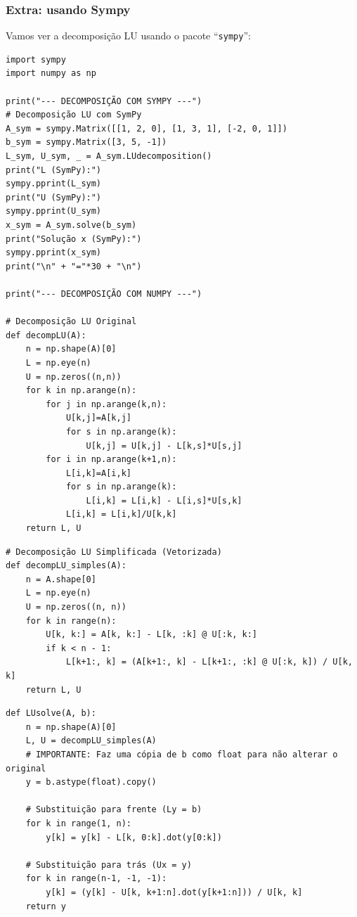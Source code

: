 \documentclass[../numerical_methods.tex]{subfiles}
\begin{document}
\subsubsection{Extra: usando Sympy}
Vamos ver a decomposição LU usando o pacote ``\texttt{sympy}'':
\begin{listing}[H]
	\begin{verbatim}
import sympy
import numpy as np

print("--- DECOMPOSIÇÃO COM SYMPY ---")
# Decomposição LU com SymPy
A_sym = sympy.Matrix([[1, 2, 0], [1, 3, 1], [-2, 0, 1]])
b_sym = sympy.Matrix([3, 5, -1])
L_sym, U_sym, _ = A_sym.LUdecomposition()
print("L (SymPy):")
sympy.pprint(L_sym)
print("U (SymPy):")
sympy.pprint(U_sym)
x_sym = A_sym.solve(b_sym)
print("Solução x (SymPy):")
sympy.pprint(x_sym)
print("\n" + "="*30 + "\n")

print("--- DECOMPOSIÇÃO COM NUMPY ---")

# Decomposição LU Original
def decompLU(A):
    n = np.shape(A)[0]
    L = np.eye(n)
    U = np.zeros((n,n))
    for k in np.arange(n):
        for j in np.arange(k,n):
            U[k,j]=A[k,j]
            for s in np.arange(k):
                U[k,j] = U[k,j] - L[k,s]*U[s,j]
        for i in np.arange(k+1,n):
            L[i,k]=A[i,k]
            for s in np.arange(k):
                L[i,k] = L[i,k] - L[i,s]*U[s,k]
            L[i,k] = L[i,k]/U[k,k]
    return L, U
\end{verbatim}
\end{listing}
\begin{listing}[H]
	\begin{verbatim}
# Decomposição LU Simplificada (Vetorizada)
def decompLU_simples(A):
    n = A.shape[0]
    L = np.eye(n)
    U = np.zeros((n, n))
    for k in range(n):
        U[k, k:] = A[k, k:] - L[k, :k] @ U[:k, k:]
        if k < n - 1:
            L[k+1:, k] = (A[k+1:, k] - L[k+1:, :k] @ U[:k, k]) / U[k, k]
    return L, U

\end{verbatim}
	\begin{verbatim}
def LUsolve(A, b):
    n = np.shape(A)[0]
    L, U = decompLU_simples(A)
    # IMPORTANTE: Faz uma cópia de b como float para não alterar o original
    y = b.astype(float).copy()

    # Substituição para frente (Ly = b)
    for k in range(1, n):
        y[k] = y[k] - L[k, 0:k].dot(y[0:k])

    # Substituição para trás (Ux = y)
    for k in range(n-1, -1, -1):
        y[k] = (y[k] - U[k, k+1:n].dot(y[k+1:n])) / U[k, k]
    return y
\end{verbatim}
\end{listing}
\end{document}
